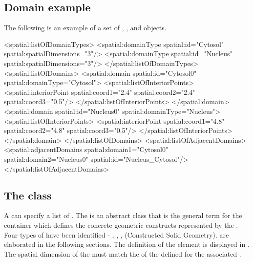 \subsection{Domain example}
\label{domain-example}
The following is an example of a set of \Domain, \DomainType, and \AdjacentDomains objects.

\begin{example}
  <spatial:listOfDomainTypes>
    <spatial:domainType spatial:id="Cytosol" spatial:spatialDimensions="3"/>
    <spatial:domainType spatial:id="Nucleus" spatial:spatialDimensions="3"/>
  </spatial:listOfDomainTypes>
  <spatial:listOfDomains>
    <spatial:domain spatial:id="Cytosol0" spatial:domainType="Cytosol">
      <spatial:listOfInteriorPoints>
        <spatial:interiorPoint spatial:coord1="2.4" spatial:coord2="2.4" spatial:coord3="0.5"/>
      </spatial:listOfInteriorPoints>
    </spatial:domain>
    <spatial:domain spatial:id="Nucleus0" spatial:domainType="Nucleus">
      <spatial:listOfInteriorPoints>
        <spatial:interiorPoint spatial:coord1="4.8" spatial:coord2="4.8" spatial:coord3="0.5"/>
      </spatial:listOfInteriorPoints>
    </spatial:domain>
  </spatial:listOfDomains>
  <spatial:listOfAdjacentDomains>
    <spatial:adjacentDomains spatial:domain1="Cytosol0" spatial:domain2="Nucleus0"
                             spatial:id="Nucleus_Cytosol"/>
  </spatial:listOfAdjacentDomains>
\end{example}


\subsection{The  class}
\label{geometrydefinition-class}
A \Geometry can specify a list of \GeometryDefinitions. The \GeometryDefinition is an abstract class that is the general term for the container which defines the concrete geometric constructs represented by the \Geometry. Four types of \GeometryDefinitions have been identified - \AnalyticGeometry, \SampledFieldGeometry, \ParametricGeometry, \CSGeometry (Constructed Solid Geometry).   are elaborated in the following sections. The definition of the \GeometryDefinition element is displayed in .  The spatial dimension of the \GeometryDefinition must match the  of the \DomainType defined for the associated \Domain.

